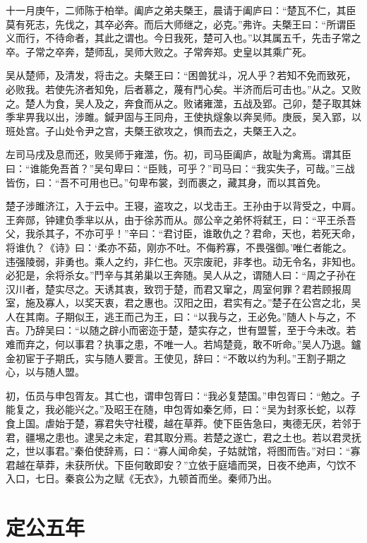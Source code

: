 \documentclass[a4paper,12pt,UTF8,twoside]{ctexbook}
\begin{document}
十一月庚午，二师陈于柏举。阖庐之弟夫槩王，晨请于阖庐曰：“楚瓦不仁，其臣莫有死志，先伐之，其卒必奔。而后大师继之，必克。”弗许。夫槩王曰：“所谓臣义而行，不待命者，其此之谓也。今日我死，楚可入也。”以其属五千，先击子常之卒。子常之卒奔，楚师乱，吴师大败之。子常奔郑。史皇以其乘广死。

吴从楚师，及清发，将击之。夫槩王曰：“困兽犹斗，况人乎？若知不免而致死，必败我。若使先济者知免，后者慕之，蔑有鬥心矣。半济而后可击也。”从之。又败之。楚人为食，吴人及之，奔食而从之。败诸雍澨，五战及郢。己卯，楚子取其妹季芈畀我以出，涉雎。鍼尹固与王同舟，王使执燧象以奔吴师。庚辰，吴入郢，以班处宫。子山处令尹之宫，夫槩王欲攻之，惧而去之，夫槩王入之。

左司马戌及息而还，败吴师于雍澨，伤。初，司马臣阖庐，故耻为禽焉。谓其臣曰：“谁能免吾首？”吴句卑曰：“臣贱，可乎？”司马曰：“我实失子，可哉。”三战皆伤，曰：“吾不可用也已。”句卑布裳，刭而裹之，藏其身，而以其首免。

楚子涉雎济江，入于云中。王寝，盗攻之，以戈击王。王孙由于以背受之，中肩。王奔郧，钟建负季芈以从，由于徐苏而从。郧公辛之弟怀将弑王，曰：“平王杀吾父，我杀其子，不亦可乎！”辛曰：“君讨臣，谁敢仇之？君命，天也，若死天命，将谁仇？《诗》曰：‘柔亦不茹，刚亦不吐。不侮矜寡，不畏强御。’唯仁者能之。违强陵弱，非勇也。乘人之约，非仁也。灭宗废祀，非孝也。动无令名，非知也。必犯是，余将杀女。”鬥辛与其弟巢以王奔随。吴人从之，谓随人曰：“周之子孙在汉川者，楚实尽之。天诱其衷，致罚于楚，而君又窜之，周室何罪？君若顾报周室，施及寡人，以奖天衷，君之惠也。汉阳之田，君实有之。”楚子在公宫之北，吴人在其南。子期似王，逃王而己为王，曰：“以我与之，王必免。”随人卜与之，不吉。乃辞吴曰：“以随之辟小而密迩于楚，楚实存之，世有盟誓，至于今未改。若难而弃之，何以事君？执事之患，不唯一人。若鸠楚竟，敢不听命。”吴人乃退。鑪金初宦于子期氏，实与随人要言。王使见，辞曰：“不敢以约为利。”王割子期之心，以与随人盟。

初，伍员与申包胥友。其亡也，谓申包胥曰：“我必复楚国。”申包胥曰：“勉之。子能复之，我必能兴之。”及昭王在随，申包胥如秦乞师，曰：“吴为封豕长蛇，以荐食上国。虐始于楚，寡君失守社稷，越在草莽。使下臣告急曰，夷德无厌，若邻于君，疆埸之患也。逮吴之未定，君其取分焉。若楚之遂亡，君之土也。若以君灵抚之，世以事君。”秦伯使辞焉，曰：“寡人闻命矣，子姑就馆，将图而告。”对曰：“寡君越在草莽，未获所伏。下臣何敢即安？”立依于庭墙而哭，日夜不绝声，勺饮不入口，七日。秦哀公为之赋《无衣》，九顿首而坐。秦师乃出。


\chapter{定公五年}
\end{document}
